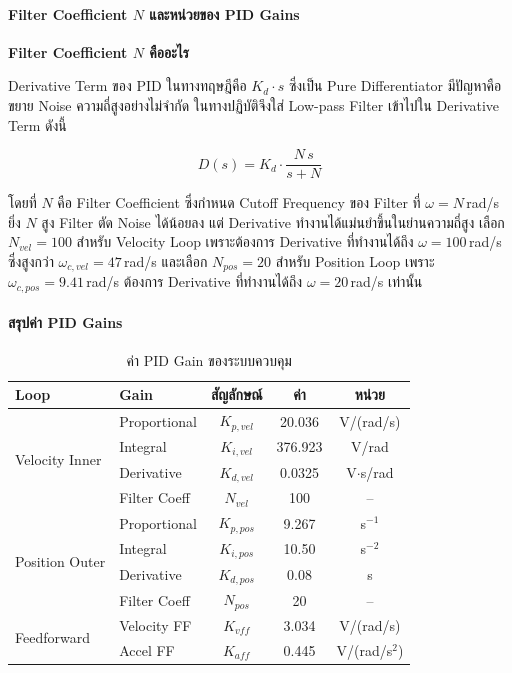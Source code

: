 \paragraph{Filter Coefficient $N$ และหน่วยของ PID Gains}

\textbf{Filter Coefficient $N$ คืออะไร}

Derivative Term ของ PID ในทางทฤษฎีคือ $K_d \cdot s$ ซึ่งเป็น Pure Differentiator
มีปัญหาคือขยาย Noise ความถี่สูงอย่างไม่จำกัด
ในทางปฏิบัติจึงใส่ Low-pass Filter เข้าไปใน Derivative Term ดังนี้

\begin{equation}
  D(s) = K_d \cdot \frac{N\,s}{s + N}
  \label{eq:derivative_filter}
\end{equation}

โดยที่ $N$ คือ Filter Coefficient ซึ่งกำหนด Cutoff Frequency ของ Filter
ที่ $\omega = N$\,rad/s ยิ่ง $N$ สูง Filter ตัด Noise ได้น้อยลง
แต่ Derivative ทำงานได้แม่นยำขึ้นในย่านความถี่สูง
เลือก $N_{vel} = 100$ สำหรับ Velocity Loop เพราะต้องการ Derivative
ที่ทำงานได้ถึง $\omega = 100$\,rad/s ซึ่งสูงกว่า $\omega_{c,vel} = 47$\,rad/s
และเลือก $N_{pos} = 20$ สำหรับ Position Loop เพราะ $\omega_{c,pos} = 9.41$\,rad/s
ต้องการ Derivative ที่ทำงานได้ถึง $\omega = 20$\,rad/s เท่านั้น

\paragraph{สรุปค่า PID Gains}

\begin{table}[H]
  \centering
  \caption{ค่า PID Gain ของระบบควบคุม}
  \label{tab:pid_gains}
  \begin{tabular}{llccc}
    \toprule
    Loop & Gain & สัญลักษณ์ & ค่า & หน่วย \\
    \midrule
    \multirow{4}{*}{Velocity Inner} & Proportional & $K_{p,vel}$ & 20.036  & V/(rad/s) \\
                                    & Integral     & $K_{i,vel}$ & 376.923 & V/rad \\
                                    & Derivative   & $K_{d,vel}$ & 0.0325  & V$\cdot$s/rad \\
                                    & Filter Coeff & $N_{vel}$   & 100     & -- \\
    \midrule
    \multirow{4}{*}{Position Outer} & Proportional & $K_{p,pos}$ & 9.267  & s$^{-1}$ \\
                                    & Integral     & $K_{i,pos}$ & 10.50  & s$^{-2}$ \\
                                    & Derivative   & $K_{d,pos}$ & 0.08   & s \\
                                    & Filter Coeff & $N_{pos}$   & 20     & -- \\
    \midrule
    \multirow{2}{*}{Feedforward}    & Velocity FF  & $K_{vff}$   & 3.034  & V/(rad/s) \\
                                    & Accel FF     & $K_{aff}$   & 0.445  & V/(rad/s$^2$) \\
    \bottomrule
  \end{tabular}
\end{table}

